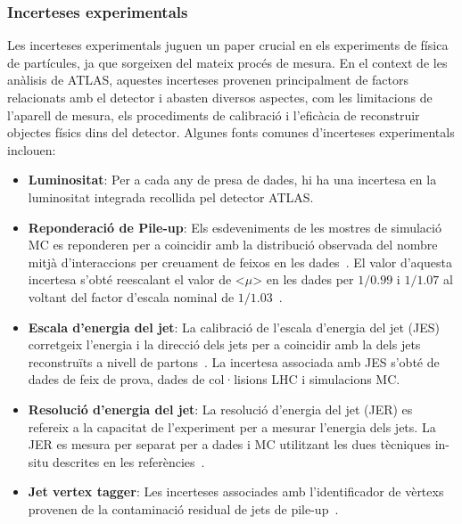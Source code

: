 \subsubsection{Incerteses experimentals}
\label{sec:resum:Incerteses:exp}
Les incerteses experimentals juguen un paper crucial en els experiments de física de partícules, ja que sorgeixen del
mateix procés de mesura. En el context de les anàlisis de ATLAS, aquestes incerteses provenen principalment de 
factors relacionats amb el detector i abasten diversos aspectes, com les limitacions de l'aparell de mesura, els
procediments de calibració i l'eficàcia de reconstruir objectes físics dins del detector. Algunes fonts comunes d'incerteses 
experimentals inclouen:
\begin{itemize}
	\item \textbf{Luminositat}: Per a cada any de presa de dades, hi ha una incertesa en la luminositat integrada 
	recollida pel detector ATLAS.
	
	\item \textbf{Reponderació de Pile-up}: Els esdeveniments de les mostres de simulació MC es reponderen 
	per a coincidir amb la distribució observada del nombre mitjà d'interaccions per creuament de feixos 
	en les dades~\cite{Marshall:2014mza}. El valor d'aquesta incertesa s'obté reescalant el valor de <$\mu$> 
	en les dades per  $1/0.99$ i $1/1.07$ al voltant del factor d'escala nominal de $1/1.03$~\cite{Buttinger:2014726}.
	
	\item \textbf{Escala d'energia del jet}: La calibració de l'escala d'energia del jet (JES) corretgeix l'energia i la direcció 
	dels jets per a coincidir amb la dels jets reconstruïts a nivell de partons~\cite{ATLAS:2020cli}. 
	La incertesa associada amb JES s'obté de dades de feix de prova, dades de col·lisions LHC
	i simulacions MC.

	\item \textbf{Resolució d'energia del jet}: La resolució d'energia del jet (JER) es refereix a la capacitat de l'experiment per 
	a mesurar l'energia dels jets. La JER es mesura per separat per a dades i MC utilitzant les dues tècniques in-situ
	descrites en les referències~\cite{ATLAS:2020cli, ATLAS:2017bje}. %
	
	\item \textbf{Jet vertex tagger}: Les incerteses associades amb l'identificador de vèrtexs provenen de la contaminació 
	residual de jets de pile-up~\cite{ATLAS-CONF-2014-018, ATLAS:2017ywy}.


\end{itemize}

